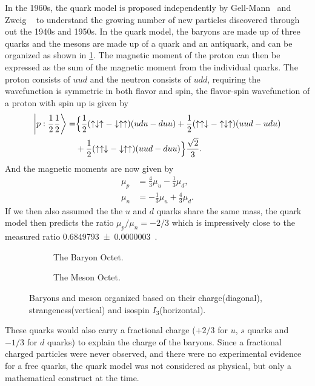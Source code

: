 \documentclass[../main.tex]{subfiles}
\begin{document}
In the 1960s, the quark model is proposed independently by Gell-Mann~\cite{gell-mann1964} and Zweig ~\cite{zweig1964a, zweig1964}
to understand the growing number of new particles discovered through out the 1940s and 1950s.
In the quark model, the baryons are made up of three quarks and the mesons are made up
of a quark and an antiquark, and can be organized as shown in \cref{fig:Octet}.
The magnetic moment of the proton can then be expressed as the sum of the magnetic moment
from the individual quarks. The proton consists of $uud$ and the neutron consists of $udd$,
requiring the wavefunction is symmetric in both flavor and spin, the flavor-spin wavefunction of a proton with
spin up is given by
\begin{equation}
	\begin{split}
		\ket{p:\frac{1}{2} \frac{1}{2}}=&  \Bigl\{\frac{1}{2}(\uparrow\downarrow\uparrow-\downarrow\uparrow\uparrow)(udu-duu) + \frac{1}{2}(\uparrow\uparrow\downarrow-\uparrow\downarrow\uparrow)(uud-udu)\\
		&+\frac{1}{2}(\uparrow\uparrow\downarrow-\downarrow\uparrow\uparrow)(uud-duu)\Bigl\} \frac{\sqrt{2}}{3}.
	\end{split}
\end{equation}
And the magnetic moments are now given by
\begin{align}
	\mu_p & = \frac{4}{3}\mu_u-\frac{1}{3}\mu_d,  \\
	\mu_n & = -\frac{1}{3}\mu_u+\frac{4}{3}\mu_d.
\end{align}
If we then also assumed the the $u$ and $d$ quarks share the same mass, the quark model
then predicts the ratio $\mu_p/\mu_n=-2/3$ which is impressively close to the measured ratio
\num{0.6849793(3)}~\cite{workman2022}.
\begin{figure}[h!]
	\centering
	\begin{subfigure}{0.45\linewidth}
		
		\caption{The Baryon Octet.}
	\end{subfigure}
	\begin{subfigure}{0.45\linewidth}
		
		\caption{The Meson Octet.}
	\end{subfigure}
	\caption{Baryons and meson organized based on their charge(diagonal), strangeness(vertical) and isospin $I_3$(horizontal). }
	\label{fig:Octet}
\end{figure}
These quarks would also carry a fractional charge ($+2/3$ for $u$, $s$ quarks and $-1/3$ for $d$ quarks) to
explain the charge of the baryons. Since a fractional charged particles were never observed, and there were
no experimental evidence for a free quarks, the quark model was not considered as physical, but only a mathematical construct at the time.
\end{document}
